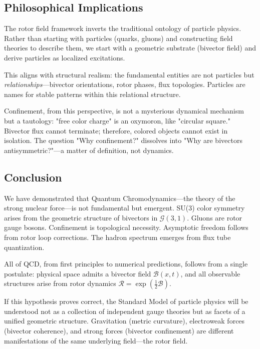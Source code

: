\documentclass[11pt,a4paper]{article}
\newcommand{\Rotor}{\mathcal{R}}
\newcommand{\Biv}{\mathcal{B}}
\newcommand{\Cl}{\mathcal{G}}
\theoremstyle{definition}
\theoremstyle{plain}
\theoremstyle{remark}
\begin{document}
\subsection{Philosophical Implications}

The rotor field framework inverts the traditional ontology of particle physics. Rather than starting with particles (quarks, gluons) and constructing field theories to describe them, we start with a geometric substrate (bivector field) and derive particles as localized excitations.

This aligns with structural realism: the fundamental entities are not particles but \emph{relationships}---bivector orientations, rotor phases, flux topologies. Particles are names for stable patterns within this relational structure.

Confinement, from this perspective, is not a mysterious dynamical mechanism but a tautology: "free color charge" is an oxymoron, like "circular square." Bivector flux cannot terminate; therefore, colored objects cannot exist in isolation. The question "Why confinement?" dissolves into "Why are bivectors antisymmetric?"---a matter of definition, not dynamics.

\subsection{Conclusion}

We have demonstrated that Quantum Chromodynamics---the theory of the strong nuclear force---is not fundamental but emergent. SU(3) color symmetry arises from the geometric structure of bivectors in $\Cl(3,1)$. Gluons are rotor gauge bosons. Confinement is topological necessity. Asymptotic freedom follows from rotor loop corrections. The hadron spectrum emerges from flux tube quantization.

All of QCD, from first principles to numerical predictions, follows from a single postulate: physical space admits a bivector field $\Biv(x,t)$, and all observable structures arise from rotor dynamics $\Rotor = \exp(\frac{1}{2}\Biv)$.

If this hypothesis proves correct, the Standard Model of particle physics will be understood not as a collection of independent gauge theories but as facets of a unified geometric structure. Gravitation (metric curvature), electroweak forces (bivector coherence), and strong forces (bivector confinement) are different manifestations of the same underlying field---the rotor field.
\end{document}
